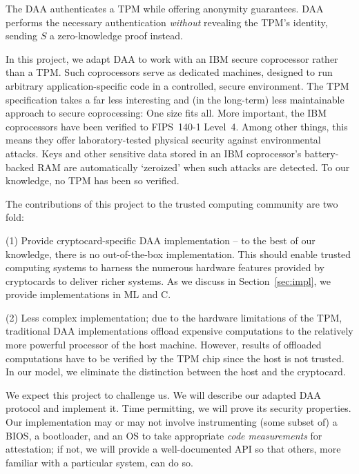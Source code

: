 The DAA authenticates a TPM
while offering anonymity guarantees.
DAA performs the necessary authentication \emph{without} revealing the TPM's identity,
sending $S$ a zero-knowledge proof instead. 

In this project, we adapt DAA to work with an IBM secure coprocessor
rather than a TPM.
Such coprocessors serve as dedicated machines, 
designed to run arbitrary application-specific
code in a controlled, secure environment.
The TPM specification takes a far less
interesting and (in the long-term) less maintainable approach to
secure coprocessing: One size fits all.
More important, the IBM coprocessors have been verified to FIPS~140-1 Level~4.
Among other things, this means they offer laboratory-tested physical security against
environmental attacks.
Keys and other sensitive data stored in an IBM coprocessor's battery-backed RAM
are automatically `zeroized' when such attacks are detected.
To our knowledge, no TPM has been so verified.

The contributions of this project to the trusted computing community are two fold:

(1) Provide cryptocard-specific DAA implementation -- to the best of our knowledge, there is no out-of-the-box implementation. This should enable trusted computing systems to harness the numerous hardware features provided by cryptocards to deliver richer systems. As we discuss in Section~\ref{sec:impl}, we provide implementations in ML and C.

(2) Less complex implementation;  due to the hardware limitations of the TPM, traditional DAA implementations offload expensive computations to the relatively more powerful processor of the host machine. However, results of offloaded computations have to be verified by the TPM chip since the host is not trusted. In our model, we eliminate the distinction between the host and the cryptocard. 

We expect this project to challenge us.
We will describe our adapted DAA protocol and implement it.
Time permitting, we will prove its security properties.
Our implementation may or may not involve instrumenting (some subset of)
a BIOS, a bootloader, and an OS to take appropriate \emph{code measurements} for attestation;
if not, we will provide a well-documented API so that others,
more familiar with a particular system, can do so.

